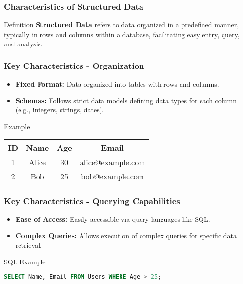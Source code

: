 \documentclass{beamer}
\begin{document}
\begin{frame}
    \frametitle{Characteristics of Structured Data}
    \begin{block}{Definition}
        \textbf{Structured Data} refers to data organized in a predefined manner, typically in rows and columns within a database, facilitating easy entry, query, and analysis.
    \end{block}
\end{frame}

\begin{frame}
    \frametitle{Key Characteristics - Organization}
    \begin{itemize}
        \item \textbf{Fixed Format:} Data organized into tables with rows and columns.
        \item \textbf{Schemas:} Follows strict data models defining data types for each column (e.g., integers, strings, dates).
    \end{itemize}
    \begin{block}{Example}
        \begin{tabular}{|c|c|c|c|}
            \hline
            ID  & Name    & Age & Email              \\
            \hline
            1   & Alice   & 30  & alice@example.com  \\
            2   & Bob     & 25  & bob@example.com    \\
            \hline
        \end{tabular}
    \end{block}
\end{frame}

\begin{frame}
    \frametitle{Key Characteristics - Querying Capabilities}
    \begin{itemize}
        \item \textbf{Ease of Access:} Easily accessible via query languages like SQL.
        \item \textbf{Complex Queries:} Allows execution of complex queries for specific data retrieval.
    \end{itemize}
    \begin{block}{SQL Example}
    \begin{lstlisting}[language=SQL]
    SELECT Name, Email FROM Users WHERE Age > 25;
    \end{lstlisting}
    \end{block}
\end{frame}
\end{document}
